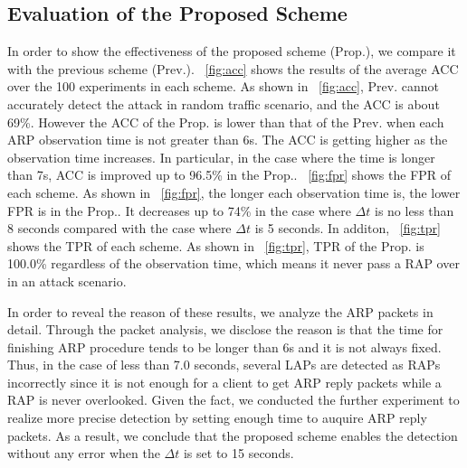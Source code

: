 \documentclass[conference]{IEEEtran}
\begin{document}
\subsection{Evaluation of the Proposed Scheme}
In order to show the effectiveness of the proposed scheme (Prop.), we compare it with the previous scheme \cite{previous} (Prev.).
\figurename~\ref{fig:acc} shows the results of the average ACC over the 100 experiments in each scheme.
As shown in \figurename~\ref{fig:acc}, Prev. cannot accurately detect the attack in random traffic scenario, and the ACC is about 69\%.
However the ACC of the Prop. is lower than that of the Prev. when each ARP observation time is not greater than 6s.
The ACC is getting higher as the observation time increases.
In particular, in the case where the time is longer than 7s, ACC is improved up to 96.5\% in the Prop..
\figurename~\ref{fig:fpr} shows the FPR of each scheme.
As shown in \figurename~\ref{fig:fpr}, the longer each observation time is, the lower FPR is in the Prop..
It decreases up to 74\% in the case where $\Delta t$ is no less than 8 seconds compared with the case where $\Delta t$ is 5 seconds.
In additon, \figurename~\ref{fig:tpr} shows the TPR of each scheme.
As shown in \figurename~\ref{fig:tpr}, TPR of the Prop. is 100.0\% regardless of the observation time, which means it never pass a RAP over in an attack scenario. 

In order to reveal the reason of these results, we analyze the ARP packets in detail.
Through the packet analysis, we disclose the reason is that the time for finishing ARP procedure tends to be longer than 6s and it is not always fixed.
Thus, in the case of less than 7.0 seconds, several LAPs are detected as RAPs incorrectly since it is not enough for a client to get ARP reply packets while a RAP is never overlooked.
Given the fact, we conducted the further experiment to realize more precise detection by setting enough time to auquire ARP reply packets.
As a result, we conclude that the proposed scheme enables the detection without any error when the $\Delta t$ is set to 15 seconds.
\end{document}
